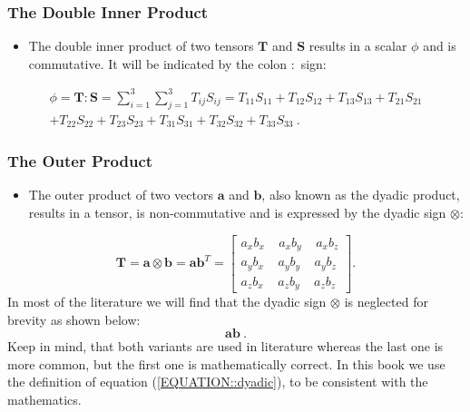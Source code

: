 \documentclass[MathematicsNumericsDerivationsAndOpenFOAM.tex]{subfiles}
\begin{document}
\subsubsection{The Double Inner Product}
%
%
\begin{itemize}
   \item The double inner product of two tensors $\textbf{T}$ and $\textbf{S}$
   results in a scalar $\phi$ and is commutative. It will be indicated by
   the colon  $\boldsymbol \colon$ sign:
\end{itemize}
%
%
\begin{multline}
 \phi = \textbf{T} \boldsymbol \colon \textbf{S} = \sum_{i=1}^{3}\sum_{j=1}^{3} T_{ij} S_{ij}
=
 T_{11} S_{11} + T_{12} S_{12} + T_{13} S_{13} + T_{21} S_{21} \\
+
 T_{22} S_{22} +
 T_{23} S_{23} + T_{31} S_{31} + T_{32} S_{32} + T_{33} S_{33} ~.
\label{EQUATION::doubleInnerProduct}
\end{multline}
%
%
%
%
\subsubsection{The Outer Product}
%
%
\begin{itemize}
    \item The outer product of two vectors $\textbf{a}$ and $\textbf{b}$,
    also known as the dyadic product, results in a tensor, is non-commutative
    and is expressed by the dyadic sign $\otimes$:
\end{itemize}
%
%
%
\begin{equation}
  \textbf{T} = \textbf{a} \otimes \textbf{b} = \textbf{a} \textbf{b}^T =   \left[
  \begin{matrix}
   a_xb_x ~ ~ ~ ~ ~ a_xb_y ~ ~ ~ ~ ~ a_xb_z \\
   a_yb_x ~ ~ ~ ~ ~ a_yb_y ~ ~ ~ ~ ~ a_yb_z \\
   a_zb_x ~ ~ ~ ~ ~ a_zb_y ~ ~ ~ ~ ~ a_zb_z
  \end{matrix}
  \right].
   \label{EQUATION::dyadic}
\end{equation}
%
%
	In most of the literature we will find that the dyadic sign $\otimes$ is
    neglected for brevity as shown below:
%
%
\begin{equation}
  \textbf{a}\textbf{b}~.
  \label{EQUATION::outerProduct}
\end{equation}
%
%
	Keep in mind, that both variants are used in literature whereas the last
    one is more common, but the first one is mathematically correct. In this
    book we use the definition of equation (\ref{EQUATION::dyadic}), to be
    consistent with the mathematics.
%
%
%
%
\end{document}
